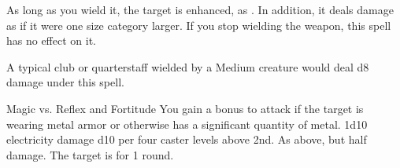 \begin{spellheader}
    \begin{spelltargetinginfo}
    \end{spelltargetinginfo}
    \begin{spelleffects}
    \end{spelleffects}
\end{spellheader}
\begin{spellcontent}
    \spelleffect As long as you wield it, the target is enhanced, as . In addition, it deals damage as if it were one size category larger. If you stop wielding the weapon, this spell has no effect on it.
    \spelldur{\durshort}
\end{spellcontent}
\begin{spellfooter}
    \spellnotes A typical club or quarterstaff wielded by a Medium creature would deal d8 damage under this spell.
\end{spellfooter}

\begin{spellheader}
    \begin{spelltargetinginfo}
    \end{spelltargetinginfo}
    \begin{spelleffects}
    \end{spelleffects}
\end{spellheader}
\begin{spellcontent}
    \begin{spellattack}{Magic vs. Reflex and Fortitude}
        \spellspecial You gain a  bonus to attack if the target is wearing metal armor or otherwise has a significant quantity of metal.
        \spellsuccess[Reflex] 1d10 electricity damage \add d10 per four caster levels above 2nd.
        \spellfailure[Reflex] As above, but half damage.
         The target is \staggered for 1 round.
    \end{spellattack}
\end{spellcontent}
\begin{spellfooter}

\end{spellfooter}

